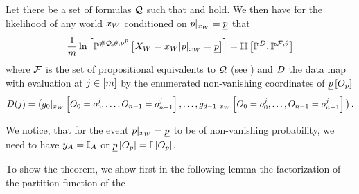 \begin{theorem}
    \label{the:FOLworldToPLdataset}
    Let there be a set of formulas $\mathcal{Q}$ %
    such that %
     and  hold.
    We then have for the likelihood of any world $x_{W}$ conditioned on ${p}|_{x_{W}}=\underline{p}$ that
    \begin{align*}
        \frac{1}{m} \ln \left[ \mathbb{P}^{\#\mathcal{Q},\theta,\nu^{\underline{p}}}\left[X_{W}=x_{W}|{p}|_{x_{W}}=\underline{p}\right] \right]
        = \mathbb{H}\left[\mathbb{P}^{D},\mathbb{P}^{\mathcal{F},\theta}\right]
    \end{align*}
    where $\mathcal{F}$ is the set of propositional equivalents to $\mathcal{Q}$ (see ) and $D$ the data map with evaluation at $j\in[m]$ by the enumerated non-vanishing coordinates of $\underline{p}\left[O_{p}\right]$
    \begin{align*}
        D(j)
        = \big( {g_{0}}|_{x_{W}} \left[O_{0}=o_{0}^j,\ldots,O_{n-1}=o_{n-1}^j\right], \ldots ,
        {g_{d-1}}|_{x_{W}} \left[O_{0}=o_{0}^j,\ldots,O_{n-1}=o_{n-1}^j\right] \big) \, .
    \end{align*}
\end{theorem}

We notice, that for the event ${p}|_{x_{W}}=\underline{p}$ to be of non-vanishing probability, we need to have $y_{A}=\mathbb{I}_A$ or $\underline{p}\left[O_{p}\right]=\mathbb{I}\left[O_{p}\right]$.


To show the theorem, we show first in the following lemma the factorization of the partition function of the \HybridFOLNetwork{}.

